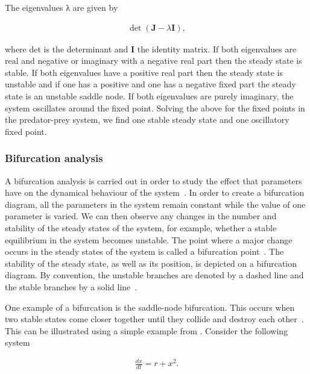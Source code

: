 \noindent The eigenvalues λ are given by

\begin{align}
\det(\mathbf{J} - λ\mathbf{I}),
\end{align}

\noindent where det is the determinant and \textbf{I} the identity matrix. If both eigenvalues are real and negative or imaginary with a negative real part then the steady state is stable. If both eigenvalues have a positive real part then the steady state is unstable and if one has a positive and one has a negative fixed part the steady state is an unstable saddle node. If both eigenvalues are purely imaginary, the system oscillates around the fixed point. Solving the above for the fixed points in the predator-prey system, we find one stable steady state and one oscillatory fixed point. 


\subsubsection{Bifurcation analysis}

A bifurcation analysis is carried out in order to study the effect that parameters have on the dynamical behaviour of the system~\autocite{Strogatz:1994}. In order to create a bifurcation diagram, all the parameters in the system remain constant while the value of one parameter is varied. We can then observe any changes in the number and stability of the steady states of the system, for example, whether a stable equilibrium in the system becomes unstable. The point where a major change occurs in the steady states of the system is called a bifurcation point~\autocite{iglesias:2010}. The stability of the steady state, as well as its position, is depicted on a bifurcation diagram. By convention, the unstable branches are denoted by a dashed line and the stable branches by a solid line~\autocite{Strogatz:1994}. 

One example of a bifurcation is the saddle-node bifurcation. This occurs when two stable states come closer together until they collide and destroy each other~\autocite{Strogatz:1994}. This can be illustrated using a simple example from \textcite{Strogatz:1994}. Consider the following system 

\begin{align*}
	\frac{dx}{dt} = r + x^2.
\end{align*}

